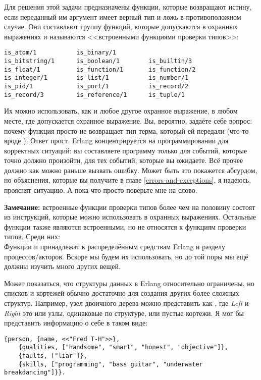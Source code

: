 Для решения этой задачи предназначены функции, которые возвращают истину, если переданный им аргумент имеет верный тип и ложь в противоположном случае.
Они составляют группу функций, которые допускаются в охранных выражениях и называются <<встроенными функциями проверки типов>>:
\begin{lstlisting}[style=erlang]
is_atom/1           is_binary/1        
is_bitstring/1      is_boolean/1        is_builtin/3       
is_float/1          is_function/1       is_function/2      
is_integer/1        is_list/1           is_number/1        
is_pid/1            is_port/1           is_record/2        
is_record/3         is_reference/1      is_tuple/1        
\end{lstlisting}

Их можно использовать, как и любое другое охранное выражение, в любом месте, где допускается охранное выражение.
Вы, вероятно, задаёте себе вопрос: почему функция просто не возвращает тип терма, который ей передали (что\--то вроде ).
Ответ прост.
Erlang концентрируется на программировании для корректных ситуаций: вы составляете программу только для событий, которые точно должно произойти, для тех событий, которые вы ожидаете.
Всё прочее должно как можно раньше вызвать ошибку.
Может быть это покажется абсурдом, но объяснения, которые вы получите в главе \ref{errors-and-exceptions}, я надеюсь, прояснят ситуацию.
А пока что просто поверьте мне на слово.\\
\colorbox{lgray}
{
    \begin{minipage}{\linewidth}
\textbf{Замечание:} встроенные функции проверки типов более чем на половину состоят из инструкций, которые можно использовать в охранных выражениях.
Остальные функции также являются встроенными, но не относятся к функциям проверки типов.
Среди них: 
\\
Функции  и  принадлежат к распределённым средствам Erlang и разделу процессов/акторов.
Вскоре мы будем их использовать, но до той поры мы ещё должны изучить много других вещей.
    \end{minipage}
}

Может показаться, что структуры данных в Erlang относительно ограничены, но списков и кортежей обычно достаточно для создания других более сложных структур.
Например, узел двоичного дерева можно представить как , где \emph{Left} и \emph{Right} это или узлы, одинаковые по структуре, или пустые кортежи.
Я мог бы представить информацию о себе в таком виде:
\begin{lstlisting}[style=erlang]
{person, {name, <<"Fred T-H">>},
    {qualities, ["handsome", "smart", "honest", "objective"]},
    {faults, ["liar"]},
    {skills, ["programming", "bass guitar", "underwater breakdancing"]}}.
\end{lstlisting}

